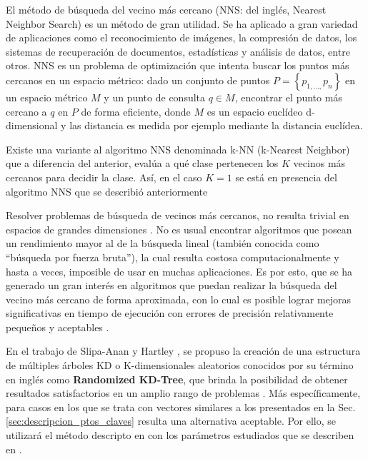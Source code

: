 El m\'etodo de búsqueda del vecino más cercano (NNS: del inglés, Nearest Neighbor Search) \cite{AryaEtAl98} es un método de gran utilidad. Se ha aplicado a gran variedad de aplicaciones como el reconocimiento de imágenes, la compresión de datos, los sistemas de recuperación de documentos, estadísticas y análisis de datos, entre otros. %
NNS es un problema de optimización que intenta buscar los puntos más cercanos en un espacio métrico: dado un conjunto de puntos $P=\left\{ p_{1,...,}p_{n}\right\}$ en un espacio métrico $M$ y un punto de consulta $q \in M$, encontrar el punto más cercano a $q$ en $P$ de forma eficiente, donde $M$ es un espacio euclídeo d-dimensional y las distancia es medida por ejemplo mediante la distancia euclídea.

Existe una variante al algoritmo NNS denominada k-NN (k-Nearest Neighbor) que a diferencia del anterior, evalúa a qué clase pertenecen los $K$ vecinos más cercanos para decidir la clase. Así, en el caso $K=1$ se está en presencia del algoritmo NNS que se describió anteriormente

Resolver problemas de búsqueda de vecinos más cercanos, no resulta trivial en espacios de grandes dimensiones \cite{muja_flann_2009}. No es usual encontrar algoritmos que posean un rendimiento mayor al de la búsqueda lineal (también conocida como ``búsqueda por fuerza bruta''), la cual resulta costosa computacionalmente y hasta a veces, imposible de usar en muchas aplicaciones. Es por esto, que se ha generado un gran interés en algoritmos que puedan realizar la búsqueda del vecino más cercano de forma aproximada, con lo cual es posible lograr mejoras significativas en tiempo de ejecución con errores de precisión relativamente pequeños y aceptables \cite{muja_flann_2009, Beis:1997:SIU:794189.794431}. %

En el trabajo de Slipa-Anan y Hartley \cite{Silpa_KDTree, bb77826}, se propuso la creación de una estructura de múltiples árboles KD o K-dimensionales aleatorios conocidos por su término en inglés como \textbf{Randomized KD-Tree}, que brinda la posibilidad de obtener resultados satisfactorios en un amplio rango de problemas \cite{muja_flann_2009}. Más específicamente, para casos en los que se trata con vectores similares a los presentados en la Sec. \ref{sec:descripcion_ptos_claves} resulta una alternativa aceptable. Por ello, se utilizará el método descripto en \cite{Silpa_KDTree, bb77826} con los parámetros estudiados que se describen en \cite{muja_flann_2009}.
